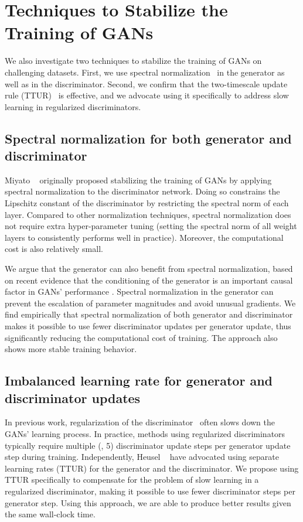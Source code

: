 \documentclass{article}
\begin{document}
\section{Techniques to Stabilize the Training of GANs}

We also investigate two techniques to stabilize the training of GANs on challenging datasets.
First, we use spectral normalization~\cite{Miyato18a} in the generator as well as in the discriminator.
Second, we confirm that the two-timescale update rule (TTUR)~\cite{HeuselRUNH17} is effective, and we advocate using it specifically to address slow learning in regularized discriminators.



\subsection{Spectral normalization for both generator and discriminator}

Miyato \etal~\cite{Miyato18a} originally proposed stabilizing the training of GANs by applying spectral normalization to the discriminator network.
Doing so constrains the Lipschitz constant of the discriminator by restricting the spectral norm of each layer.
Compared to other normalization techniques, spectral normalization does not require extra hyper-parameter tuning (setting the spectral norm of all weight layers to  consistently performs well in practice).
Moreover, the computational cost is also relatively small.


We argue that the generator can also benefit from spectral normalization, based on recent evidence that the conditioning of the generator is an important causal factor in GANs' performance \cite{Odena18}.
Spectral normalization in the generator can prevent the escalation of parameter magnitudes and avoid unusual gradients.
We find empirically that spectral normalization of both generator and discriminator makes it possible to use fewer discriminator updates per generator update, thus significantly reducing the computational cost of training. The approach also shows more stable training behavior.



\subsection{Imbalanced learning rate for generator and discriminator updates}

In previous work, regularization of the discriminator~\cite{Miyato18a, GulrajaniAADC17} often slows down the GANs' learning process.
In practice, methods using regularized discriminators typically require multiple (\eg, 5) discriminator update steps per generator update step during training.
Independently, Heusel \etal~\cite{HeuselRUNH17} have advocated using separate learning rates (TTUR) for the generator and the discriminator.
We propose using TTUR specifically to compensate for the problem of slow learning in a regularized discriminator, making it possible to use fewer discriminator steps per generator step.
Using this approach, we are able to produce better results given the same wall-clock time.
\end{document}

